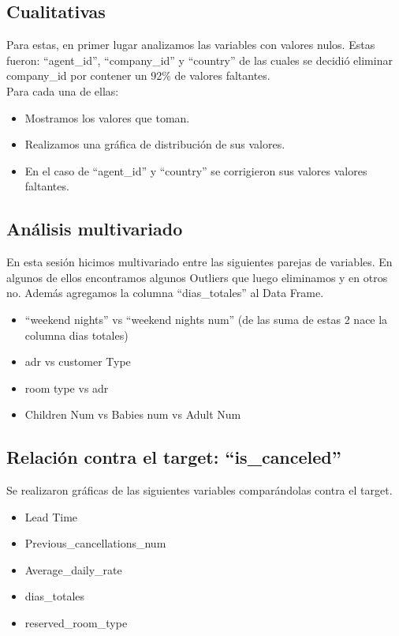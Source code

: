 \documentclass{article}
\begin{document}
\subsection*{Cualitativas}
Para estas, en primer lugar analizamos las variables con valores nulos. Estas fueron: “agent\_id”, “company\_id” y “country” de las cuales se decidió eliminar company\_id  por contener un 92\% de valores faltantes.\\
Para cada una de ellas:
\begin{itemize}
	\item Mostramos los valores que toman.
	\item Realizamos una gráfica de distribución de sus valores.
	\item En el caso de “agent\_id” y “country” se corrigieron sus valores valores faltantes.
\end{itemize}

\subsection*{Análisis multivariado}

En esta sesión hicimos multivariado entre las siguientes parejas de variables. En algunos de ellos encontramos algunos Outliers que luego eliminamos y en otros no. Además agregamos la columna “dias\_totales” al Data Frame.

\begin{itemize}
	\item “weekend nights” vs “weekend nights num” (de las suma de estas 2 nace la columna dias totales)
	\item adr vs customer Type
	\item room type vs adr
	\item Children Num vs Babies num vs Adult Num
\end{itemize}

\subsection*{Relación contra el target: “is\_canceled”}
Se realizaron gráficas de las siguientes variables comparándolas contra el target. 

\begin{itemize}
	\item Lead Time
	\item Previous\_cancellations\_num
	\item Average\_daily\_rate
	\item dias\_totales
	\item reserved\_room\_type
\end{itemize}
\end{document}
